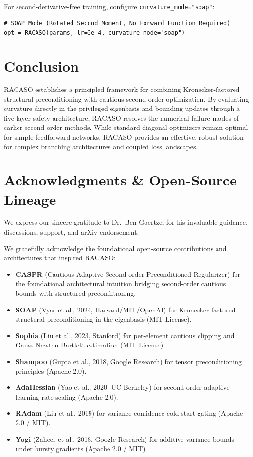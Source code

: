 \documentclass[11pt,a4paper]{article}
\begin{document}
For second-derivative-free training, configure \texttt{curvature\_mode="soap"}:
\begin{verbatim}
# SOAP Mode (Rotated Second Moment, No Forward Function Required)
opt = RACASO(params, lr=3e-4, curvature_mode="soap")
\end{verbatim}

\section{Conclusion}

RACASO establishes a principled framework for combining Kronecker-factored structural preconditioning with cautious second-order optimization. By evaluating curvature directly in the privileged eigenbasis and bounding updates through a five-layer safety architecture, RACASO resolves the numerical failure modes of earlier second-order methods. While standard diagonal optimizers remain optimal for simple feedforward networks, RACASO provides an effective, robust solution for complex branching architectures and coupled loss landscapes.

\section*{Acknowledgments \& Open-Source Lineage}

We express our sincere gratitude to Dr.~Ben Goertzel for his invaluable guidance, discussions, support, and arXiv endorsement.

We gratefully acknowledge the foundational open-source contributions and architectures that inspired RACASO:
\begin{itemize}
    \item \textbf{CASPR} (Cautious Adaptive Second-order Preconditioned Regularizer) for the foundational architectural intuition bridging second-order cautious bounds with structured preconditioning.
    \item \textbf{SOAP} (Vyas et al., 2024, Harvard/MIT/OpenAI) for Kronecker-factored structural preconditioning in the eigenbasis (MIT License).
    \item \textbf{Sophia} (Liu et al., 2023, Stanford) for per-element cautious clipping and Gauss-Newton-Bartlett estimation (MIT License).
    \item \textbf{Shampoo} (Gupta et al., 2018, Google Research) for tensor preconditioning principles (Apache 2.0).
    \item \textbf{AdaHessian} (Yao et al., 2020, UC Berkeley) for second-order adaptive learning rate scaling (Apache 2.0).
    \item \textbf{RAdam} (Liu et al., 2019) for variance confidence cold-start gating (Apache 2.0 / MIT).
    \item \textbf{Yogi} (Zaheer et al., 2018, Google Research) for additive variance bounds under bursty gradients (Apache 2.0 / MIT).
\end{itemize}
\end{document}
